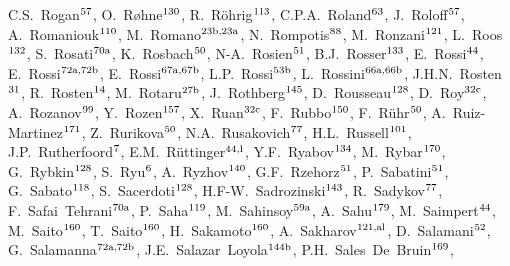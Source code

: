 \begin{flushleft}
C.S.~Rogan$^\textrm{\scriptsize 57}$,    
O.~R{\o}hne$^\textrm{\scriptsize 130}$,    
R.~R\"ohrig$^\textrm{\scriptsize 113}$,    
C.P.A.~Roland$^\textrm{\scriptsize 63}$,    
J.~Roloff$^\textrm{\scriptsize 57}$,    
A.~Romaniouk$^\textrm{\scriptsize 110}$,    
M.~Romano$^\textrm{\scriptsize 23b,23a}$,    
N.~Rompotis$^\textrm{\scriptsize 88}$,    
M.~Ronzani$^\textrm{\scriptsize 121}$,    
L.~Roos$^\textrm{\scriptsize 132}$,    
S.~Rosati$^\textrm{\scriptsize 70a}$,    
K.~Rosbach$^\textrm{\scriptsize 50}$,    
N-A.~Rosien$^\textrm{\scriptsize 51}$,    
B.J.~Rosser$^\textrm{\scriptsize 133}$,    
E.~Rossi$^\textrm{\scriptsize 44}$,    
E.~Rossi$^\textrm{\scriptsize 72a,72b}$,    
E.~Rossi$^\textrm{\scriptsize 67a,67b}$,    
L.P.~Rossi$^\textrm{\scriptsize 53b}$,    
L.~Rossini$^\textrm{\scriptsize 66a,66b}$,    
J.H.N.~Rosten$^\textrm{\scriptsize 31}$,    
R.~Rosten$^\textrm{\scriptsize 14}$,    
M.~Rotaru$^\textrm{\scriptsize 27b}$,    
J.~Rothberg$^\textrm{\scriptsize 145}$,    
D.~Rousseau$^\textrm{\scriptsize 128}$,    
D.~Roy$^\textrm{\scriptsize 32c}$,    
A.~Rozanov$^\textrm{\scriptsize 99}$,    
Y.~Rozen$^\textrm{\scriptsize 157}$,    
X.~Ruan$^\textrm{\scriptsize 32c}$,    
F.~Rubbo$^\textrm{\scriptsize 150}$,    
F.~R\"uhr$^\textrm{\scriptsize 50}$,    
A.~Ruiz-Martinez$^\textrm{\scriptsize 171}$,    
Z.~Rurikova$^\textrm{\scriptsize 50}$,    
N.A.~Rusakovich$^\textrm{\scriptsize 77}$,    
H.L.~Russell$^\textrm{\scriptsize 101}$,    
J.P.~Rutherfoord$^\textrm{\scriptsize 7}$,    
E.M.~R{\"u}ttinger$^\textrm{\scriptsize 44,l}$,    
Y.F.~Ryabov$^\textrm{\scriptsize 134}$,    
M.~Rybar$^\textrm{\scriptsize 170}$,    
G.~Rybkin$^\textrm{\scriptsize 128}$,    
S.~Ryu$^\textrm{\scriptsize 6}$,    
A.~Ryzhov$^\textrm{\scriptsize 140}$,    
G.F.~Rzehorz$^\textrm{\scriptsize 51}$,    
P.~Sabatini$^\textrm{\scriptsize 51}$,    
G.~Sabato$^\textrm{\scriptsize 118}$,    
S.~Sacerdoti$^\textrm{\scriptsize 128}$,    
H.F-W.~Sadrozinski$^\textrm{\scriptsize 143}$,    
R.~Sadykov$^\textrm{\scriptsize 77}$,    
F.~Safai~Tehrani$^\textrm{\scriptsize 70a}$,    
P.~Saha$^\textrm{\scriptsize 119}$,    
M.~Sahinsoy$^\textrm{\scriptsize 59a}$,    
A.~Sahu$^\textrm{\scriptsize 179}$,    
M.~Saimpert$^\textrm{\scriptsize 44}$,    
M.~Saito$^\textrm{\scriptsize 160}$,    
T.~Saito$^\textrm{\scriptsize 160}$,    
H.~Sakamoto$^\textrm{\scriptsize 160}$,    
A.~Sakharov$^\textrm{\scriptsize 121,al}$,    
D.~Salamani$^\textrm{\scriptsize 52}$,    
G.~Salamanna$^\textrm{\scriptsize 72a,72b}$,    
J.E.~Salazar~Loyola$^\textrm{\scriptsize 144b}$,    
P.H.~Sales~De~Bruin$^\textrm{\scriptsize 169}$,    

\end{flushleft}
